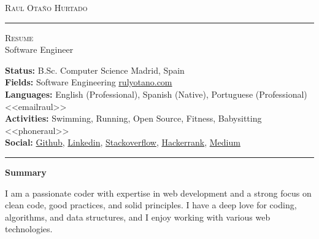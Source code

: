 \documentclass[10pt,A4]{article}
\newcommand{\cvsection}[1]
{
	\begin{center}
		\large\textcolor{sectcol}{\textbf{#1}}
	\end{center}
}
\newcommand{\metasection}[2]
{
\footnotesize{#2} \hspace*{\fill} \footnotesize{#1}\\[1pt]
}
\begin{document}



\vspace{-8pt}
\begin{center}
	\HUGE \textsc{Raul Otaño Hurtado} \textcolor{sectcol}{\rule[-1mm]{1mm}{0.9cm}} \textsc{Resume}\\[2pt]
	\small Software Engineer
\end{center}



\vspace{6pt}


\metasection{Madrid, Spain}{\textbf{Status:} B.Sc. Computer Science}
\metasection{\href{https://rulyotano.com}{rulyotano.com}}{\textbf{Fields:} Software Engineering} 
\metasection{<<emailraul>>}{\textbf{Languages:} English (Professional), Spanish (Native), Portuguese (Professional)}
\metasection{<<phoneraul>>}{\textbf{Activities:} Swimming, Running, Open Source, Fitness, Babysitting}
\metasection{}{\textbf{Social:} \href{https://github.com/rulyotano}{Github}, \href{https://www.linkedin.com/in/raulotanohurtado}{Linkedin}, \href{https://stackoverflow.com/users/1655482}{Stackoverflow}, \href{https://www.hackerrank.com/rulyotano}{Hackerrank}, \href{https://medium.com/@rulyotano}{Medium}}
\vspace{-2pt}
\textcolor{softcol}{\hrule}
\vspace{6pt}

\normalsize

\vspace{-6pt}
\cvsection{Summary}
I am a passionate coder with expertise in web development and a strong focus on clean code, good practices, and solid principles. I have a deep love for coding, algorithms, and data structures, and I enjoy working with various web technologies.\\
\end{document}
